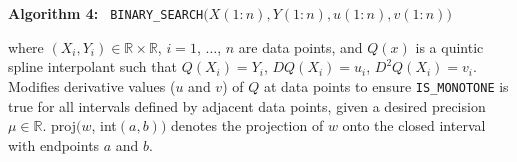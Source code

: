 \begin{plain}
\parskip=0pt
\vskip 5mm {\parindent 0mm {\bf Algorithm 4:} {\tt
    BINARY\_SEARCH}$\bigl(X(1{:}n), Y(1{:}n), u(1{:}n), v(1{:}n) \bigr)$

where $(X_i,Y_i) \in \mathbb{R}\times\mathbb{R}$, $i = 1$, $\ldots$, $n$ are
data points, and $Q(x)$ is a quintic spline interpolant such that
$Q(X_i) = Y_i$, $DQ(X_i) = u_i$, $D^2Q(X_i) = v_i$. Modifies
derivative values ($u$ and $v$) of $Q$ at data points to ensure
{\tt IS\_MONOTONE} is true for all intervals defined by adjacent data
points, given a desired precision $\mu \in {\mathbb R}$. proj$\bigl(w$,
int$(a,b)\bigr)$ denotes the projection of $w$ onto the closed
interval with endpoints $a$ and $b$.

}
\end{plain}
